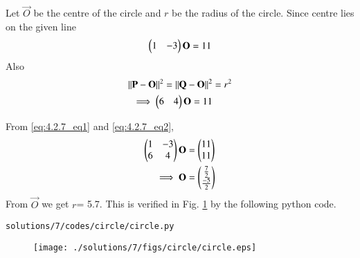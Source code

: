  Let $\vec{O}$ be the centre of the circle and $r$ be the radius of the circle. Since centre lies on the given line
\begin{align}
\begin{pmatrix}1&-3\end{pmatrix}\mathbf{O} = 11
\label{eq:4.2.7_eq1}
\end{align}
 Also 
\begin{align}
\left\lVert\mathbf{P} - \mathbf{O}\right\rVert^2 = \left\lVert\mathbf{Q}- \mathbf{O}\right\rVert^2 &= r^2 
\\
\implies 
\begin{pmatrix}6&4\end{pmatrix}\mathbf{O} = 11
\label{eq:4.2.7_eq2}
\end{align}

From \eqref{eq:4.2.7_eq1} and \eqref{eq:4.2.7_eq2}, 
\begin{align}
\begin{pmatrix}1&-3\\6&4\end{pmatrix}\mathbf{O} &= \begin{pmatrix}11\\11\end{pmatrix} \\
\implies 
\mathbf{O} &= \begin{pmatrix}\frac{7}{2}\\\frac{-5}{2}\end{pmatrix}
\end{align}
From  $\vec{O}$ we get $r$= 5.7.
This is verified in Fig. \ref{fig:4.2.7} by the following python code.
\begin{lstlisting}
solutions/7/codes/circle/circle.py
\end{lstlisting}
\begin{figure}[!ht]
\centering
\texttt{[image: ./solutions/7/figs/circle/circle.eps]}
\caption{}
\label{fig:4.2.7}
\end{figure}


